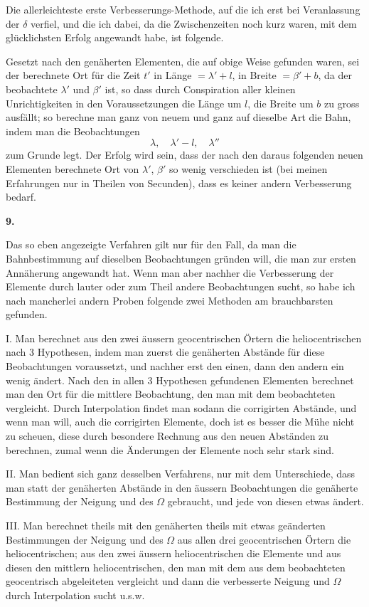 \documentclass[10pt,a4paper]{article}
\begin{document}
Die allerleichteste erste Verbesserungs-Methode, auf die ich erst bei Veranlassung der $\delta$ verfiel, und die ich dabei, da die Zwischenzeiten noch kurz waren, mit dem glücklichsten Erfolg angewandt habe, ist folgende.

Gesetzt nach den genäherten Elementen, die auf obige Weise gefunden waren, sei der berechnete Ort für die Zeit $t'$ in Länge $= \lambda' + l$, in Breite $= \beta' + b$, da der beobachtete $\lambda'$ und $\beta'$ ist, so dass durch Conspiration aller kleinen Unrichtigkeiten in den Voraussetzungen die Länge um $l$, die Breite um $b$ zu gross ausfällt; so berechne man ganz von neuem und ganz auf dieselbe Art die Bahn, indem man die Beobachtungen
\[
\lambda, \quad \lambda' - l, \quad \lambda''
\]
zum Grunde legt. Der Erfolg wird sein, dass der nach den daraus folgenden neuen Elementen berechnete Ort von $\lambda'$, $\beta'$ so wenig verschieden ist (bei meinen Erfahrungen nur in Theilen von Secunden), dass es keiner andern Verbesserung bedarf.

\clearpage
\noindent
\textbf{9.}

\medskip
\noindent
Das so eben angezeigte Verfahren gilt nur für den Fall, da man die Bahnbestimmung auf dieselben Beobachtungen gründen will, die man zur ersten Annäherung angewandt hat. Wenn man aber nachher die Verbesserung der Elemente durch lauter oder zum Theil andere Beobachtungen sucht, so habe ich nach mancherlei andern Proben folgende zwei Methoden am brauchbarsten gefunden.

I. Man berechnet aus den zwei äussern geocentrischen Örtern die heliocentrischen nach 3 Hypothesen, indem man zuerst die genäherten Abstände für diese Beobachtungen voraussetzt, und nachher erst den einen, dann den andern ein wenig ändert. Nach den in allen 3 Hypothesen gefundenen Elementen berechnet man den Ort für die mittlere Beobachtung, den man mit dem beobachteten vergleicht. Durch Interpolation findet man sodann die corrigirten Abstände, und wenn man will, auch die corrigirten Elemente, doch ist es besser die Mühe nicht zu scheuen, diese durch besondere Rechnung aus den neuen Abständen zu berechnen, zumal wenn die Änderungen der Elemente noch sehr stark sind.

II. Man bedient sich ganz desselben Verfahrens, nur mit dem Unterschiede, dass man statt der genäherten Abstände in den äussern Beobachtungen die genäherte Bestimmung der Neigung und des $\Omega$ gebraucht, und jede von diesen etwas ändert.

III. Man berechnet theils mit den genäherten theils mit etwas geänderten Bestimmungen der Neigung und des $\Omega$ aus allen drei geocentrischen Örtern die heliocentrischen; aus den zwei äussern heliocentrischen die Elemente und aus diesen den mittlern heliocentrischen, den man mit dem aus dem beobachteten geocentrisch abgeleiteten vergleicht und dann die verbesserte Neigung und $\Omega$ durch Interpolation sucht u.s.w.
\end{document}
